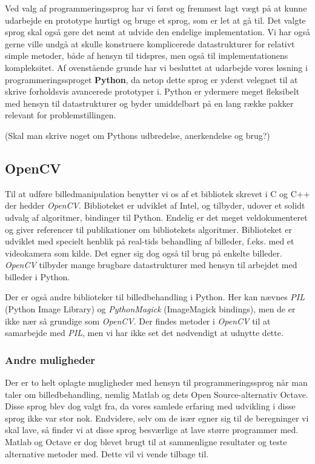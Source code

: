 {
Ved valg af programmeringssprog har vi først og fremmest lagt vægt på at
kunne udarbejde en prototype hurtigt og bruge et sprog, som er let at gå
til. Det valgte sprog skal også gøre det nemt at udvide den endelige
implementation. Vi har også gerne ville undgå at skulle konstruere
komplicerede datastrukturer for relativt simple metoder, både af hensyn
til tidspres, men også til implementationens kompleksitet. Af
ovenstående grunde har vi besluttet at udarbejde vores løsning i
programmeringssproget \textbf{Python}, da netop dette sprog er yderst
velegnet til at skrive forholdsvis avancerede prototyper i. Python er
ydermere meget fleksibelt med hensyn til datastrukturer og byder
umiddelbart på en lang række pakker relevant for problemstillingen.

(Skal man skrive noget om Pythons udbredelse, anerkendelse og brug?)

\subsection{OpenCV}
Til at udføre billedmanipulation benytter vi os af et bibliotek skrevet
i C og C++ der hedder \emph{OpenCV}. Biblioteket er udviklet af Intel,
og tilbyder, udover et solidt udvalg af algoritmer, bindinger til
Python.  Endelig er det meget veldokumenteret og giver referencer til
publikationer om bibliotekets algoritmer. Biblioteket er udviklet med
specielt henblik på real-tids behandling af billeder, f.eks. med et
videokamera som kilde. Det egner sig dog også til brug på enkelte
billeder.  \emph{OpenCV} tilbyder mange brugbare datastrukturer med
hensyn til arbejdet med billeder i Python.

Der er også andre biblioteker til billedbehandling i Python. Her kan
nævnes \emph{PIL} (Python Image Library) og \emph{PythonMagick}
(ImageMagick bindings), men de er ikke nær så grundige som
\emph{OpenCV}. Der findes metoder i \emph{OpenCV} til at samarbejde med
\emph{PIL}, men vi har ikke set det nødvendigt at udnytte dette.

\subsubsection{Andre muligheder}
Der er to helt oplagte mugligheder med hensyn til programmeringssprog
når man taler om billedbehandling, nemlig Matlab og dets Open
Source-alternativ Octave. Disse sprog blev dog valgt fra, da vores
samlede erfaring med udvikling i disse sprog ikke var stor nok.
Endvidere, selv om de især egner sig til de beregninger vi skal lave, så
finder vi at disse sprog besværlige at lave større programmer med.
Matlab og Octave er dog blevet brugt til at sammenligne resultater og
teste alternative metoder med. Dette vil vi vende tilbage til.

}
